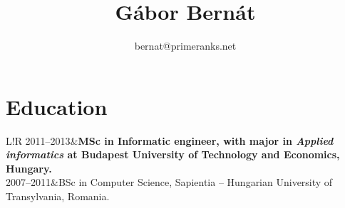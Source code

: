 \documentclass[10pt]{article}
\title{\bfseries\Huge Gábor Bernát}
\author{bernat@primeranks.net}
\date{}
\newcommand\VRule{\color{lightgray}\vrule width 0.5pt}
\begin{document}
\begin{minipage}{0.55\textwidth}
\begingroup
\let\center\flushleft
\let\endcenter\endflushleft
\maketitle
\endgroup
\end{minipage}
\begin{minipage}{0.35\textwidth}
\end{minipage}

\section*{Education}
\begin{tabular}{L!{\VRule}R}
2011--2013&{\bf MSc in Informatic engineer, with major in \emph{Applied informatics} at Budapest University of Technology and Economics, Hungary.}\\[5pt]
2007--2011&BSc in Computer Science, Sapientia -- Hungarian University of Transylvania, Romania.\\
\end{tabular}
\end{document}
